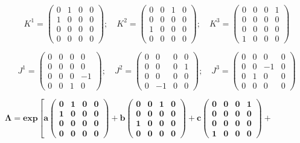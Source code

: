$$K^1=\begin{pmatrix} 0 & 1 & 0 & 0 \\ 1 & 0 & 0 & 0 \\ 0 & 0 & 0 & 0 \\ 0 & 0 & 0 & 0 \end{pmatrix};\quad K^2=\begin{pmatrix} 0 & 0 & 1 & 0 \\ 0 & 0 & 0 & 0 \\ 1 & 0 & 0 & 0 \\ 0 & 0 & 0 & 0 \end{pmatrix};\quad K^3= \begin{pmatrix} 0 & 0 & 0 & 1 \\ 0 & 0 & 0 & 0 \\ 0 & 0 & 0 & 0 \\ 1 & 0 & 0 & 0 \end{pmatrix}$$ 

$$J^1=\begin{pmatrix} 0 & 0 & 0 & 0 \\ 0 & 0 & 0 & 0 \\ 0 & 0 & 0 & -1 \\ 0 & 0 & 1 & 0 \end{pmatrix};\quad J^2=\begin{pmatrix} 0 & 0 & 0 & 0 \\ 0 & 0 & 0 & 1 \\ 0 & 0 & 0 & 0 \\ 0 & -1 & 0 & 0 \end{pmatrix};\quad J^3=\begin{pmatrix} 0 & 0 & 0 & 0 \\ 0 & 0 & -1 & 0 \\ 0 & 1 & 0 & 0 \\ 0 & 0 & 0 & 0 \end{pmatrix} $$

\vspace{5mm}

\hspace{1cm} $\boldsymbol{ 
\Lambda =exp\left[ a\begin{pmatrix} 0 & 1 & 0 & 0 \\ 1 & 0 & 0 & 0 \\ 0 & 0 & 0 & 0 \\ 0 & 0 & 0 & 0 \end{pmatrix}+b\begin{pmatrix} 0 & 0 & 1 & 0 \\ 0 & 0 & 0 & 0 \\ 1 & 0 & 0 & 0 \\ 0 & 0 & 0 & 0 \end{pmatrix}+c\begin{pmatrix} 0 & 0 & 0 & 1 \\ 0 & 0 & 0 & 0 \\ 0 & 0 & 0 & 0 \\ 1 & 0 & 0 & 0 \end{pmatrix}+  \right. } $

